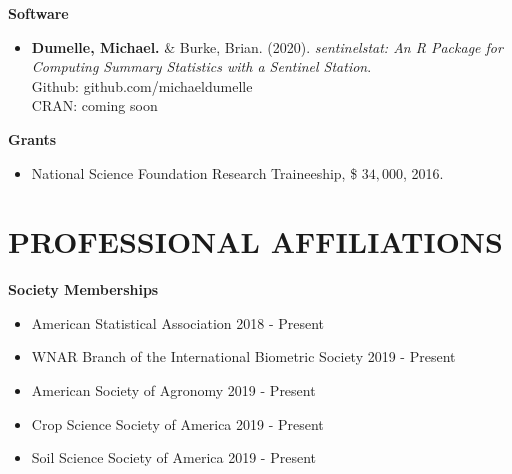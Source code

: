 \documentclass[line, margin, 10pt]{res}\usepackage[]{graphicx}\usepackage[]{color}
\begin{document}
\begin{resume}
\begin{itemize}
\end{itemize}

\textbf{Software}

\begin{itemize}
	\item \textbf{Dumelle, Michael.} \& Burke, Brian. (2020). \emph{sentinelstat: An R Package for Computing Summary Statistics with a Sentinel Station}. \\
	Github: github.com/michaeldumelle \\
	CRAN: coming soon
\end{itemize}

\textbf{Grants} 
\begin{itemize}
	\item National Science Foundation Research Traineeship, \$ $34,000$, 2016.
\end{itemize}

\section{PROFESSIONAL AFFILIATIONS}

\textbf{Society Memberships}
\begin{itemize}
  \item American Statistical Association \hfill 2018 - Present
  \item WNAR Branch of the International Biometric Society \hfill 2019 - Present
  \item  American Society of Agronomy \hfill 2019 - Present
  \item  Crop Science Society of America \hfill 2019 - Present
  \item  Soil Science Society of America \hfill 2019 - Present 
  
\end{itemize}




\end{resume}
\end{document}
